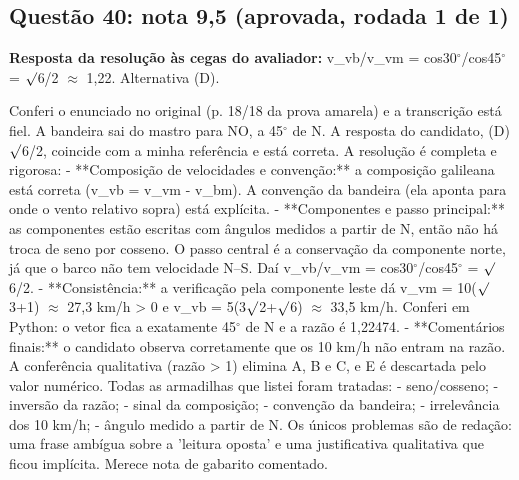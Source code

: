 \documentclass{article}%
\begin{document}
\subsection*{Questão 40: nota 9,5 (aprovada, rodada 1 de 1)}%
\textbf{Resposta da resolução às cegas do avaliador:} v\_vb/v\_vm = cos30$^\circ$/cos45$^\circ$ = $\surd$6/2 $\approx$ 1,22. Alternativa (D).\par %
Conferi o enunciado no original (p. 18/18 da prova amarela) e a transcrição está fiel. A bandeira sai do mastro para NO, a 45$^\circ$ de N. A resposta do candidato, (D) $\surd$6/2, coincide com a minha referência e está correta.\newline%
\newline%
A resolução é completa e rigorosa:\newline%
{-} **Composição de velocidades e convenção:** a composição galileana está correta (v\_vb = v\_vm - v\_bm). A convenção da bandeira (ela aponta para onde o vento relativo sopra) está explícita.\newline%
{-} **Componentes e passo principal:** as componentes estão escritas com ângulos medidos a partir de N, então não há troca de seno por cosseno. O passo central é a conservação da componente norte, já que o barco não tem velocidade N--S. Daí v\_vb/v\_vm = cos30$^\circ$/cos45$^\circ$ = $\surd$6/2.\newline%
{-} **Consistência:** a verificação pela componente leste dá v\_vm = 10($\surd$3+1) $\approx$ 27,3 km/h > 0 e v\_vb = 5(3$\surd$2+$\surd$6) $\approx$ 33,5 km/h. Conferi em Python: o vetor fica a exatamente 45$^\circ$ de N e a razão é 1,22474.\newline%
{-} **Comentários finais:** o candidato observa corretamente que os 10 km/h não entram na razão. A conferência qualitativa (razão > 1) elimina A, B e C, e E é descartada pelo valor numérico.\newline%
\newline%
Todas as armadilhas que listei foram tratadas:\newline%
{-} seno/cosseno;\newline%
{-} inversão da razão;\newline%
{-} sinal da composição;\newline%
{-} convenção da bandeira;\newline%
{-} irrelevância dos 10 km/h;\newline%
{-} ângulo medido a partir de N.\newline%
\newline%
Os únicos problemas são de redação: uma frase ambígua sobre a 'leitura oposta' e uma justificativa qualitativa que ficou implícita. Merece nota de gabarito comentado.%
\end{document}
